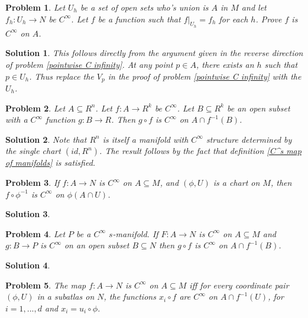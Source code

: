\documentclass{article}
\theoremstyle{problemstyle}
\newtheorem{problem}{Problem}
\theoremstyle{problemstyle}
\newtheorem{solution}{Solution}
\theoremstyle{problemstyle}
\theoremstyle{problemstyle}
\theoremstyle{problemstyle}
\theoremstyle{problemstyle}
\begin{document}
\begin{problem}
Let $U_h$ be a set of open sets who's union is $A$ in $M$ and let $f_h:U_h \rightarrow N$ be $C^\infty$. Let $f$ be a function such that $f|_{U_h} = f_h$ for each $h$. Prove $f$ is $C^\infty$ on $A$. 
\end{problem}

\begin{solution}
This follows directly from the argument given in the reverse direction of problem \ref{pointwise C infinity}. At any point $p \in A$, there exists an $h$ such that $p \in U_h$. Thus replace the $V_p$ in the proof of problem \ref{pointwise C infinity} with the $U_h$.
\end{solution}

\begin{problem}
Let $A \subseteq R^n$. Let $f:A \rightarrow R^k$ be $C^\infty$. Let $B \subseteq R^k$ be an open subset with a $C^\infty$ function $g:B\rightarrow R$. Then $g \circ f$ is $C^\infty$ on $A \cap f^{-1}(B)$.   
\end{problem}

\begin{solution}
Note that $R^n$ is itself a manifold with $C^\infty$ structure determined by the single chart $(id,R^n)$. The result follows by the fact that definition \ref{C^s map of manifolds} is satisfied. 
\end{solution}

\begin{problem}
If $f:A \rightarrow N$ is $C^\infty$ on $A \subseteq M$, and $(\phi,U)$ is a chart on $M$, then $f \circ \phi^{-1}$ is $C^\infty$ on $\phi(A \cap U)$. 
\end{problem}

\begin{solution}

\end{solution}

\begin{problem}
Let $P$ be a $C^{\infty}$ $s$-manifold. If $F:A\rightarrow N$ is $C^\infty$ on $A \subseteq M$ and $g:B \rightarrow P$ is $C^\infty$ on an open subset $B \subseteq N$ then $g \circ f$ is $C^\infty$ on $A \cap f^{-1}(B)$. 
\end{problem}

\begin{solution}

\end{solution}

\begin{problem}
The map $f:A \rightarrow N$ is $C^\infty$ on $A \subseteq M$ iff for every coordinate pair $(\phi,U)$ in a subatlas on $N$, the functions $x_i \circ f$ are $C^\infty$ on $A \cap f^{-1}(U)$, for $i = 1,...,d$ and $x_i = u_i \circ \phi$.
\end{problem}
\end{document}
